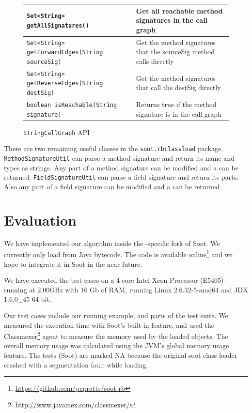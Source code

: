 \documentclass{sigplanconf}
\begin{document}
\begin{figure}[htbf]
\begin{tabularx}{\columnwidth}{|XX|}
\hline
{\tt Set<String> getAllSignatures()} & Get all reachable method 
    signatures in the call graph\\\hline 
{\tt Set<String> getForwardEdges(String sourceSig)} & Get the
    method signatures that the sourceSig method calls directly\\\hline  
{\tt Set<String> getReverseEdges(String destSig)} & Get the
    method signatures that call the destSig directly\\\hline
{\tt boolean isReachable(String signature)} & Returns true if the
    method signature is in the call graph\\\hline
\end{tabularx}
\caption{{\tt StringCallGraph} API}
\label{fig:scg}
\end{figure}

There are two remaining useful classes in the {\tt soot.\-rb\-class\-load} package. {\tt MethodSignatureUtil} can parse a method signature and return its name and types as strings. Any part of a method signature can be modified and a \sootmethod can be returned. {\tt FieldSignatureUtil} can parse a field signature and return its parts. Also any part of a field signature can be modified and a \sootfield can be returned.

\section{Evaluation}
\label{sec:eval}

We have implemented our algorithm inside the \rb{}-specific fork of Soot. We currently only load from Java bytecode. The code is available online\footnote{\url{https://github.com/pcpratts/soot-rb}} and we hope to integrate it in Soot in the near future.

We have executed the test cases on a 4 core Intel Xeon Processor (E5405) running at 2.00GHz with 16 Gb of RAM, running Linux 2.6.32-5-amd64 and JDK 1.6.0\_45 64-bit. 

Our test cases include our running example, and parts of the \rb test suite. We measured the execution time with Soot's built-in feature, and used the Classmexer\footnote{\url{http://www.javamex.com/classmexer/}} agent to measure the memory used by the loaded \sootclass objects. The overall memory usage was calculated using the JVM's global memory usage feature. The \rb tests (Soot) are marked NA because the original soot class loader crashed with a segmentation fault while loading.
\end{document}
